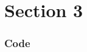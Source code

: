 \section{Section 3}\label{sec:section-3}
\begin{frame}[allowframebreaks]
    \frametitle{Code \autocite{wiki_elastic}}

    \inputminted[fontsize=\scriptsize]{python}{code/code.py}
\end{frame}
